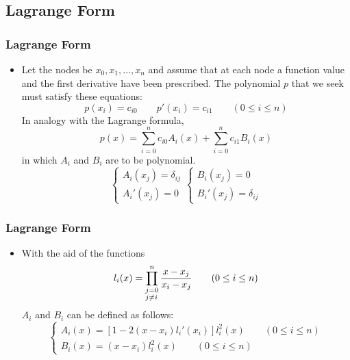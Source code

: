 \documentclass[notheorems,mathserif,table,compress]{beamer}  %
\begin{document}
\subsection{Lagrange Form}


\begin{frame}
  \frametitle{Lagrange Form}
  \begin{itemize}
  \item Let the nodes be $x_0,x_1,\ldots,x_n$ and assume that at each node a function value and the first derivative have been prescribed. The polynomial $p$ that we seek must satisfy these equations:
  \begin{displaymath}
  p(x_i)=c_{i0}\qquad p'(x_i)=c_{i1}\qquad (0\leq i\leq n)
  \end{displaymath}
  In analogy with the Lagrange formula,
  \begin{displaymath}
  p(x)=\sum_{i=0}^{n}c_{i0}A_i(x)+\sum_{i=0}^{n}c_{i1}B_i(x)
  \end{displaymath}
  in which $A_i$ and $B_i$ are to be polynomial.
  \begin{displaymath}
  \left \{\begin{array}{l}
  A_i(x_j)=\delta_{ij}\\
  A_i'(x_j)=0
  \end{array} \right.
  \left \{\begin{array}{l}
  B_i(x_j)=0\\
  B_i'(x_j)=\delta_{ij}
  \end{array} \right.
  \end{displaymath}
  \end{itemize}
\end{frame}


\begin{frame}
  \frametitle{Lagrange Form}
  \begin{itemize}
  \item With the aid of the functions
  \begin{displaymath}
  l_i(x)=\prod_{\begin{subarray}{l}
  j=0\\
  j\neq i
  \end{subarray}}^n\frac{x-x_j}{x_i-x_j}\qquad (0\leq i\leq n)
  \end{displaymath}
  $A_i$ and $B_i$ can be defined as follows:
  \begin{displaymath}
  \left \{\begin{array}{ll}
  A_i(x)=[1-2(x-x_i)l_i'(x_i)]l_i^2(x)\qquad (0\leq i\leq n)\\
  B_i(x)=(x-x_i)l_i^2(x)\qquad (0\leq i\leq n)
  \end{array} \right.
  \end{displaymath}
  \end{itemize}
\end{frame}
\end{document}
